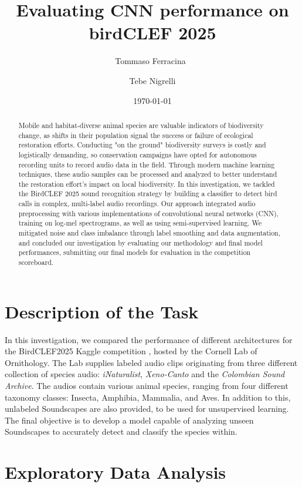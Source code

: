 \documentclass[11pt]{article}
\title{Evaluating CNN performance on birdCLEF 2025}
\author{
  Tommaso Ferracina\
  \and
  Tebe Nigrelli
}
\date{\today}
\begin{document}
\maketitle

\begin{abstract}
  Mobile and habitat-diverse animal species are valuable indicators of biodiversity change, as shifts in their population signal the success or failure of ecological restoration efforts. Conducting "on the ground" biodiversity surveys is costly and logistically demanding, so conservation campaigns have opted for autonomous recording units to record audio data in the field. Through modern machine learning techniques, these audio samples can be processed and analyzed to better understand the restoration effort's impact on local biodiversity. In this investigation, we tackled the BirdCLEF 2025 sound recognition strategy by building a classifier to detect bird calls in complex, multi-label audio recordings. Our approach integrated audio preprocessing with various implementations of convolutional neural networks (CNN), training on log-mel spectrograms, as well as using semi-supervised learning. We mitigated noise and class imbalance through label smoothing and data augmentation, and concluded our investigation by evaluating our methodology and final model performances, submitting our final models for evaluation in the competition scoreboard.
\end{abstract}

\section*{Description of the Task}

In this investigation, we compared the performance of different architectures for the BirdCLEF2025 Kaggle competition \cite{birdclef2025}, hosted by the Cornell Lab of Ornithology. The Lab supplies labeled audio clips originating from three different collection of species audio: \textit{iNaturalist}, \textit{Xeno-Canto} and the \textit{Colombian Sound Archive}. The audios contain various animal species, ranging from four different taxonomy classes: Insecta, Amphibia, Mammalia, and Aves. In addition to this, unlabeled Soundscapes are also provided, to be used for unsupervised learning. The final objective is to develop a model capable of analyzing unseen Soundscapes to accurately detect and classify the species within.

\section*{Exploratory Data Analysis}
\end{document}
